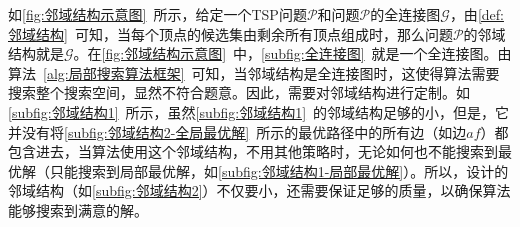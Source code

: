 \par
如\autoref{fig:邻域结构示意图}~所示，给定一个TSP问题$\mathcal{P}$和问题$\mathcal{P}$的全连接图$\mathcal{G}$，由\autoref{def:邻域结构}~可知，当每个顶点的候选集由剩余所有顶点组成时，那么问题$\mathcal{P}$的邻域结构就是$\mathcal{G}$。在\autoref{fig:邻域结构示意图}~中，\autoref{subfig:全连接图}~就是一个全连接图。由算法~\ref{alg:局部搜索算法框架}~可知，当邻域结构是全连接图时，这使得算法需要搜索整个搜索空间，显然不符合题意。因此，需要对邻域结构进行定制。如\autoref{subfig:邻域结构1}~所示，虽然\autoref{subfig:邻域结构1}~的邻域结构足够的小，但是，它并没有将\autoref{subfig:邻域结构2-全局最优解}~所示的最优路径中的所有边（如边$af$）都包含进去，当算法使用这个邻域结构，不用其他策略时，无论如何也不能搜索到最优解（只能搜索到局部最优解，如\autoref{subfig:邻域结构1-局部最优解}）。所以，设计的邻域结构（如\autoref{subfig:邻域结构2}）不仅要小，还需要保证足够的质量，以确保算法能够搜索到满意的解。

